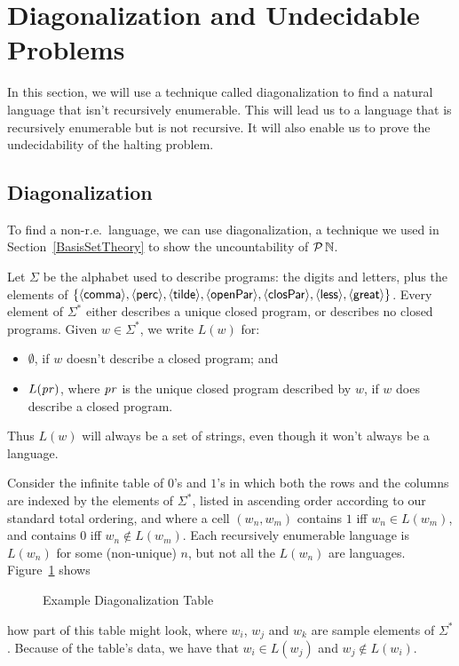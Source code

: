 \section{Diagonalization and Undecidable Problems}
\label{DiagonalizationAndUndecidableProblems}

In this section, we will use a technique called diagonalization to
find a natural language that isn't recursively enumerable.  This will
lead us to a language that is recursively enumerable but is not
recursive.  It will also enable us to prove the undecidability of the
halting problem.

\subsection{Diagonalization}

To find a non-r.e.\ language, we can use diagonalization, a technique
we used in Section~\ref{BasisSetTheory} to show the uncountability of
${\cal P} \,\mathbb{N}$.

Let $\Sigma$ be the alphabet used to describe programs: the digits and
letters, plus the elements of $\{{\langle\mathsf{comma}\rangle}, {\langle\mathsf{perc}\rangle}, {\langle\mathsf{tilde}\rangle},
{\langle\mathsf{openPar}\rangle}, {\langle\mathsf{closPar}\rangle}, {\langle\mathsf{less}\rangle}, {\langle\mathsf{great}\rangle}\}$.  Every element of
$\Sigma^*$ either describes a unique closed program, or describes no
closed programs.  Given $w\in\Sigma^*$, we write $L(w)$ for:
\begin{itemize}
\item $\emptyset$, if $w$ doesn't describe a closed program; and

\item $L(\mathit{pr})$, where $\mathit{pr}$ is the unique closed program described by
  $w$, if $w$ does describe a closed program.
\end{itemize}
Thus $L(w)$ will always be a set of strings, even though it won't
always be a language.

Consider the infinite table of $0$'s and $1$'s in which both the rows
and the columns are indexed by the elements of $\Sigma^*$, listed in
ascending order according to our standard total ordering, and where a
cell $(w_n, w_m)$ contains $1$ iff $w_n\in L(w_m)$, and contains $0$
iff $w_n\not\in L(w_m)$.
Each recursively enumerable language is $L(w_n)$ for some (non-unique)
$n$, but not all the $L(w_n)$ are languages.
Figure~\ref{DiagTable} shows
\begin{figure}
\begin{center}

\end{center}
\caption{Example Diagonalization Table}
\label{DiagTable}
\end{figure}
how part of this table might look, where $w_i$, $w_j$ and $w_k$ are
sample elements of $\Sigma^*$.  Because of the table's data, we have
that $w_i\in L(w_j)$ and $w_j\not\in L(w_i)$.

